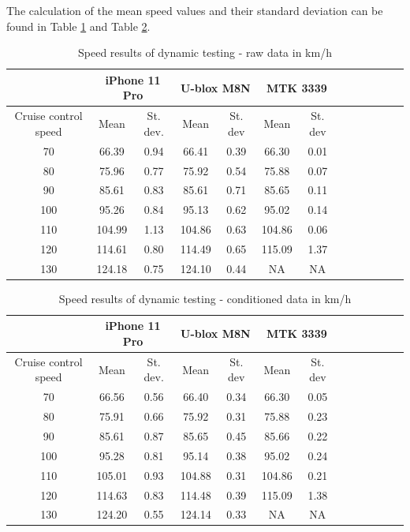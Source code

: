\documentclass{article}
\begin{document}
			The calculation of the mean speed values and their standard deviation can be found in Table \ref{table:dyn_speed_raw} and Table \ref{table:dyn_speed_conditioned}.
			\begin{table}[h]
			\centering
				\begin{tabular}{|c|c|c|c|c|c|c|c|c|c|c|c|c|}
				\hline 
				& \multicolumn{2}{c|}{iPhone 11 Pro} & \multicolumn{2}{c|}{U-blox M8N} & \multicolumn{2}{c|}{MTK 3339} \\ 
				\hline 
				Cruise control speed & Mean & St. dev. & Mean & St. dev & Mean & St. dev \\ 
				\hline 
				70 & 66.39 & 0.94 & 66.41 & 0.39 & 66.30 & 0.01 \\ 
				\hline 
				80 & 75.96 & 0.77 & 75.92 & 0.54 & 75.88 & 0.07 \\ 
				\hline 
				90 & 85.61 & 0.83 & 85.61 & 0.71 & 85.65 & 0.11 \\ 
				\hline 
				100 & 95.26 & 0.84 & 95.13 & 0.62 & 95.02 & 0.14 \\ 
				\hline 
				110 & 104.99 & 1.13 & 104.86 & 0.63 & 104.86 & 0.06 \\ 
				\hline 
				120 & 114.61 & 0.80 & 114.49 & 0.65 & 115.09 & 1.37 \\ 
				\hline 
				130 & 124.18 & 0.75 & 124.10 & 0.44 & NA & NA \\ 
				\hline 
				\end{tabular} 
			\caption{Speed results of dynamic testing - raw data in km/h}
			\label{table:dyn_speed_raw}			
			\end{table}
			\begin{table}[h]
				\centering
				\begin{tabular}{|c|c|c|c|c|c|c|c|c|c|c|c|c|}
				\hline 
				& \multicolumn{2}{c|}{iPhone 11 Pro} & \multicolumn{2}{c|}{U-blox M8N} & \multicolumn{2}{c|}{MTK 3339} \\ 
				\hline 
				Cruise control speed & Mean & St. dev. & Mean & St. dev & Mean & St. dev \\ 
				\hline 
				70 & 66.56 & 0.56 & 66.40 & 0.34 & 66.30 & 0.05 \\ 
				\hline 
				80 & 75.91 & 0.66 & 75.92 & 0.31 & 75.88 & 0.23 \\ 
				\hline 
				90 & 85.61 & 0.87 & 85.65 & 0.45 & 85.66 & 0.22 \\ 
				\hline 
				100 & 95.28 & 0.81 & 95.14 & 0.38 & 95.02 & 0.24 \\ 
				\hline 
				110 & 105.01 & 0.93 & 104.88 & 0.31 & 104.86 & 0.21 \\ 
				\hline 
				120 & 114.63 & 0.83 & 114.48 & 0.39 & 115.09 & 1.38 \\ 
				\hline 
				130 & 124.20 & 0.55 & 124.14 & 0.33 & NA & NA \\ 
				\hline 
				\end{tabular} 
			\caption{Speed results of dynamic testing - conditioned data in km/h}
			\label{table:dyn_speed_conditioned}
			\end{table}
\end{document}
